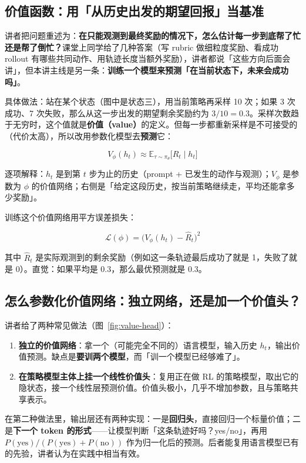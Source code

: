 \documentclass[a4paper]{article}
\begin{document}
\subsection{价值函数：用「从历史出发的期望回报」当基准}

讲者把问题重述为：\textbf{在只能观测到最终奖励的情况下，怎么估计每一步到底帮了忙还是帮了倒忙？}课堂上同学给了几种答案（写 rubric 做细粒度奖励、看成功 rollout 有哪些共同动作、用轨迹长度当额外奖励），讲者都说「这些方向后面会讲」，但本讲主线是另一条：\textbf{训练一个模型来预测「在当前状态下，未来会成功吗」}。

具体做法：站在某个状态（图中是状态三），用当前策略再采样 10 次；如果 3 次成功、7 次失败，那么从这一步出发的期望剩余奖励约为 $3/10=0.3$。采样次数趋于无穷时，这个值就是\textbf{价值（value）}的定义。但每一步都重新采样是不可接受的（代价太高），所以改用参数化模型去\textbf{预测}它：

$$V_\phi(h_t) \approx \mathbb{E}_{\tau \sim \pi_\theta}\big[R_t \mid h_t\big]$$

逐项解释：$h_t$ 是到第 $t$ 步为止的历史（prompt + 已发生的动作与观测）；$V_\phi$ 是参数为 $\phi$ 的价值网络；右侧是「给定这段历史，按当前策略继续走，平均还能拿多少奖励」。

训练这个价值网络用平方误差损失：

$$\mathcal{L}(\phi) = \big(V_\phi(h_t) - \hat{R}_t\big)^2$$

其中 $\hat{R}_t$ 是实际观测到的剩余奖励（例如这一条轨迹最后成功了就是 1，失败了就是 0）。直觉：如果平均是 0.3，那么最优预测就是 0.3。

\subsection{怎么参数化价值网络：独立网络，还是加一个价值头？}

讲者给了两种常见做法（图~\ref{fig:value-head}）：

\begin{enumerate}
\item \textbf{独立的价值网络}：拿一个（可能完全不同的）语言模型，输入历史 $h_t$，输出价值预测。缺点是\textbf{要训两个模型}，而「训一个模型已经够难了」。
\item \textbf{在策略模型主体上挂一个线性价值头}：复用正在做 RL 的策略模型，取出它的隐状态，接一个线性层预测价值。价值头极小，几乎不增加参数，且与策略共享表示。
\end{enumerate}

在第二种做法里，输出层还有两种实现：一是\textbf{回归头}，直接回归一个标量价值；二是\textbf{下一个 token 的形式}——让模型判断「这条轨迹好吗？yes/no」，再用 $P(\text{yes})/(P(\text{yes})+P(\text{no}))$ 作为归一化后的预测。后者能复用语言模型已有的先验，讲者认为在实践中相当有效。
\end{document}
